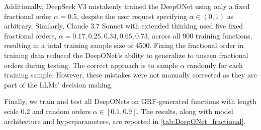 \documentclass{article}
\begin{document}
Additionally, DeepSeek V3 mistakenly trained the DeepONet using only a fixed fractional order $\alpha = 0.5$, despite the user request specifying $\alpha \in (0,1)$ as arbitrary. Similarly, Claude 3.7 Sonnet with extended thinking used five fixed fractional orders, $\alpha = 0.17, 0.25, 0.34, 0.65, 0.73$, across all 900 training functions, resulting in a total training sample size of 4500. Fixing the fractional order in training data reduced the DeepONet's ability to generalize to unseen fractional orders during testing. The correct approach is to sample $\alpha$ randomly for each training sample. However, these mistakes were not manually corrected as they are part of the LLMs' decision making.  

Finally, we train and test all DeepONets on GRF-generated functions with length scale $0.2$ and random orders $\alpha \in [0.1, 0.9]$. The results, along with model architecture and hyperparameters, are reported in \autoref{tab:DeepONet_fractional}.  
\end{document}
